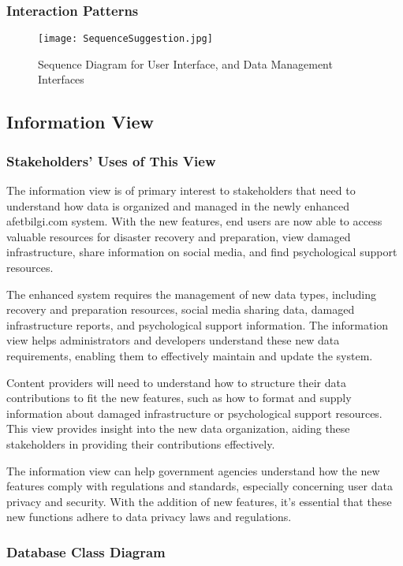 \documentclass[12pt, letterpaper]{article}
\begin{document}
\subsubsection{Interaction Patterns}

\begin{figure}[H]
\centering
\texttt{[image: SequenceSuggestion.jpg]}
\caption{Sequence Diagram for User Interface, and Data Management Interfaces}
\end{figure}

\newpage

\subsection{Information View}
\subsubsection{Stakeholders' Uses of This View}
The information view is of primary interest to stakeholders that need to understand how data is organized and managed in the newly enhanced afetbilgi.com system. With the new features, end users are now able to access valuable resources for disaster recovery and preparation, view damaged infrastructure, share information on social media, and find psychological support resources.
    
The enhanced system requires the management of new data types, including recovery and preparation resources, social media sharing data, damaged infrastructure reports, and psychological support information. The information view helps administrators and developers understand these new data requirements, enabling them to effectively maintain and update the system. 
    
Content providers will need to understand how to structure their data contributions to fit the new features, such as how to format and supply information about damaged infrastructure or psychological support resources. This view provides insight into the new data organization, aiding these stakeholders in providing their contributions effectively.
    
The information view can help government agencies understand how the new features comply with regulations and standards, especially concerning user data privacy and security. With the addition of new features, it's essential that these new functions adhere to data privacy laws and regulations.


\subsubsection{Database Class Diagram}
\end{document}
